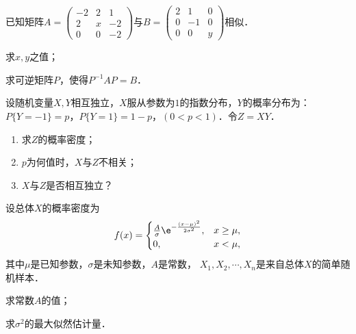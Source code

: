 \documentclass[plain,noanswer,medmath]{../../template/jnuexam}
\begin{document}
\begin{problem}[points=11]
已知矩阵$A = \begin{pmatrix}
  -2 & 2 & 1 \\
   2 & x & -2 \\
   0 & 0 & -2
\end{pmatrix}$与$B = \begin{pmatrix}
  2 &  1 & 0 \\
  0 & -1 & 0 \\
  0 &  0 & y
\end{pmatrix}$相似．\par
\begin{enumerate*}
\item 求$x,y$之值；
\item 求可逆矩阵$P$，使得$P^{-1} AP = B$．
\end{enumerate*}
\end{problem}


\begin{problem}[points=11]
设随机变量$X,Y$相互独立，$X$服从参数为$1$的指数分布，$Y$的概率分布为：
$P\{Y = - 1\} = p$，$P\{Y = 1\} = 1 - p$，$(0 < p < 1)$．令$Z = XY$．
\begin{enumerate}
\item 求$Z$的概率密度；
\item $p$为何值时，$X$与$Z$不相关；
\item $X$与$Z$是否相互独立？
\end{enumerate}
\end{problem}


\begin{problem}[points=11]
设总体$X$的概率密度为
$$f(x) = \begin{cases}
  \frac{A}{\sigma}\e^{- \frac{(x - \mu)^2}{2\sigma^2}}, & x \ge \mu , \\
                                                     0, & x < \mu ,
\end{cases}$$
其中$\mu$是已知参数，$\sigma$是未知参数，$A$是常数，
$X_1,X_2, \cdots ,X_n$是来自总体$X$的简单随机样本．\par
\begin{enumerate*}
\item 求常数$A$的值；
\item 求$\sigma^2$的最大似然估计量．
\end{enumerate*}
\end{problem}
\end{document}
